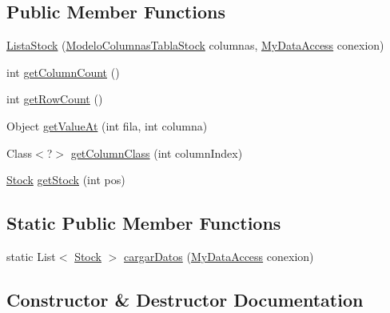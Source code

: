 \subsection*{Public Member Functions}
\begin{DoxyCompactItemize}
\item 
\mbox{\hyperlink{class_stock_1_1_lista_stock_a21df0fe48a39fb1aac80a2ca7fb67c0a}{Lista\+Stock}} (\mbox{\hyperlink{class_stock_1_1_modelo_columnas_tabla_stock}{Modelo\+Columnas\+Tabla\+Stock}} columnas, \mbox{\hyperlink{classconexion_s_q_l_1_1_my_data_access}{My\+Data\+Access}} conexion)
\item 
int \mbox{\hyperlink{class_stock_1_1_lista_stock_ad1b8da2d5ddcb4627e47533953e12d84}{get\+Column\+Count}} ()
\item 
int \mbox{\hyperlink{class_stock_1_1_lista_stock_a52c69465417c81534f1433dc56f749d9}{get\+Row\+Count}} ()
\item 
Object \mbox{\hyperlink{class_stock_1_1_lista_stock_ac181755caf0025ec10ae230927bb457f}{get\+Value\+At}} (int fila, int columna)
\item 
Class$<$?$>$ \mbox{\hyperlink{class_stock_1_1_lista_stock_a18471e9271be7455310d9a277337c38e}{get\+Column\+Class}} (int column\+Index)
\item 
\mbox{\hyperlink{class_stock_1_1_stock}{Stock}} \mbox{\hyperlink{class_stock_1_1_lista_stock_a17681900b9bdf6909a15c61b4946d080}{get\+Stock}} (int pos)
\end{DoxyCompactItemize}
\subsection*{Static Public Member Functions}
\begin{DoxyCompactItemize}
\item 
static List$<$ \mbox{\hyperlink{class_stock_1_1_stock}{Stock}} $>$ \mbox{\hyperlink{class_stock_1_1_lista_stock_ae43d6e1304e10935ed275f770f6fd743}{cargar\+Datos}} (\mbox{\hyperlink{classconexion_s_q_l_1_1_my_data_access}{My\+Data\+Access}} conexion)
\end{DoxyCompactItemize}


\subsection{Constructor \& Destructor Documentation}
\mbox{\label{class_stock_1_1_lista_stock_a21df0fe48a39fb1aac80a2ca7fb67c0a}} 
